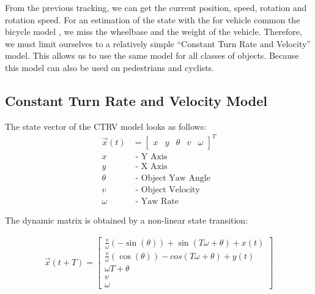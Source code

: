 \documentclass[11pt,oneside,openright]{mpreport}
\begin{document}


From the previous tracking, we can get the current position, speed, rotation and rotation speed. For an estimation of the state with the for vehicle common the bicycle model , 
we miss the wheelbase and the weight of the vehicle. Therefore, we must limit ourselves to a relatively simple ``Constant Turn Rate and Velocity'' model.
This allows us to use the same model for all classes of objects. Because this model can also be used on pedestrians and cyclists.

\subsection{Constant Turn Rate and Velocity Model}
The state vector \cite{Schubert2008} of the CTRV model looks as follows:
\begin{align*}
\vec{x}(t) &=
\begin{bmatrix}
x & y & \theta & v & \omega
\end{bmatrix}^T\\
x &\text{ - Y Axis}\\
y &\text{ - X Axis}\\
\theta &\text{ - Object Yaw Angle}\\
v &\text{ - Object Velocity}\\
\omega &\text{ - Yaw Rate}
\end{align*}

The dynamic matrix is obtained by a non-linear state transition:

\begin{align*}
\vec{x}(t + T)=
\begin{bmatrix}
\frac{v}{\omega} (-\sin(\theta)) + \sin(T \omega + \theta) + x(t) \\
\frac{v}{\omega} (\cos(\theta)) - cos(T \omega + \theta) + y(t) \\
\omega T + \theta\\
v\\
\omega
\end{bmatrix} 
\end{align*}
\end{document}

